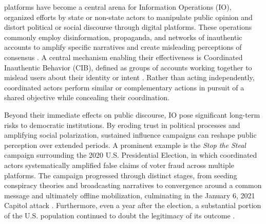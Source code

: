 \documentclass[10pt,journal,compsoc]{IEEEtran}
\begin{document}



 platforms have become a central arena for Information Operations (IO), organized efforts by state or non-state actors to manipulate public opinion and distort political or social discourse through digital platforms. These operations commonly employ disinformation, propaganda, and networks of inauthentic accounts to amplify specific narratives and create misleading perceptions of consensus \cite{weedon2017information, troll2020detection}. A central mechanism enabling their effectiveness is Coordinated Inauthentic Behavior (CIB), defined as groups of accounts working together to mislead users about their identity or intent \cite{gleicher2018coordinated, mannocci2024detection}. Rather than acting independently, coordinated actors perform similar or complementary actions in pursuit of a shared objective while concealing their coordination.

Beyond their immediate effects on public discourse, IO pose significant long-term risks to democratic institutions. By eroding trust in political processes and amplifying social polarization, sustained influence campaigns can reshape public perception over extended periods. A prominent example is the \textit{Stop the Steal} campaign surrounding the 2020 U.S. Presidential Election, in which coordinated actors systematically amplified false claims of voter fraud across multiple platforms. The campaign progressed through distinct stages, from seeding conspiracy theories and broadcasting narratives to convergence around a common message and ultimately offline mobilization, culminating in the January 6, 2021 Capitol attack \cite{coordinated2024Capitol, LongFuse2021USElections}. Furthermore, even a year after the election, a substantial portion of the U.S. population continued to doubt the legitimacy of its outcome \cite{stopthesteal2022USelections}.
\end{document}
